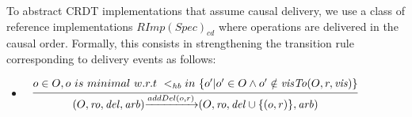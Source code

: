 To abstract CRDT implementations that assume causal delivery, we use a class of reference implementations $\mathit{RImp}(\mathit{Spec})_{\mathit{cd}}$ where operations are delivered in the causal order. Formally, this consists in strengthening the transition rule corresponding to delivery events as follows:


\begin {itemize}
\setlength{\itemsep}{0.5pt}
\item[-] $\begin{array}{l c} \bigfrac{o \in O, o \ is \ minimal \ w.r.t \ <_{\mathit{hb}} in \ \{ o' \vert o' \in O \wedge o' \notin \mathit{visTo}(O,r,\mathit{vis}) \}} {(O,\mathit{ro},\mathit{del},\mathit{arb}) {\xrightarrow{addDel(o,r)}} (O,\mathit{ro},\mathit{del} \cup \{ (o,r) \},\mathit{arb})} \end{array}$
\end{itemize}






